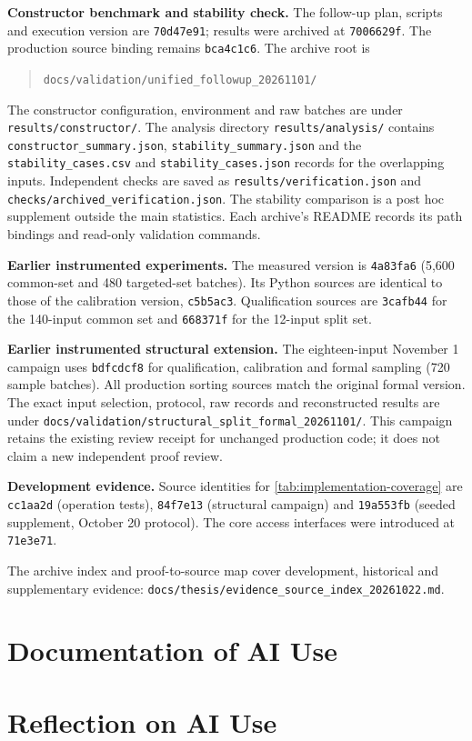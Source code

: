 \textbf{Constructor benchmark and stability check.} The follow-up plan,
scripts and execution version are \texttt{70d47e91}; results were archived
at \texttt{7006629f}. The production source binding remains
\texttt{bca4c1c6}. The archive root is
\begin{quote}\small
\nolinkurl{docs/validation/unified_followup_20261101/}
\end{quote}
The constructor configuration, environment and raw batches are under
\nolinkurl{results/constructor/}. The analysis directory
\nolinkurl{results/analysis/} contains \nolinkurl{constructor_summary.json},
\nolinkurl{stability_summary.json} and the \nolinkurl{stability_cases.csv}
and \nolinkurl{stability_cases.json} records for the \UnifiedStabilityN{}
overlapping inputs. Independent checks are saved as
\nolinkurl{results/verification.json} and
\nolinkurl{checks/archived_verification.json}. The stability comparison is a
post hoc supplement outside the main statistics. Each archive's README
records its path bindings and read-only validation commands.

\textbf{Earlier instrumented experiments.} The measured version is \texttt{4a83fa6}
(5,600 common-set and 480 targeted-set batches). Its Python sources are
identical to those of the calibration version, \texttt{c5b5ac3}.
Qualification sources are \texttt{3cafb44} for the 140-input common set
and \texttt{668371f} for the 12-input split set.

\textbf{Earlier instrumented structural extension.} The eighteen-input November 1 campaign
uses \texttt{bdfcdcf8} for qualification, calibration and formal sampling
(720 sample batches). All production sorting sources match the original
formal version. The exact input selection, protocol, raw records and
reconstructed results are under
\nolinkurl{docs/validation/structural_split_formal_20261101/}.
This campaign retains the existing review receipt for unchanged production
code; it does not claim a new independent proof review.

\textbf{Development evidence.} Source identities for
\cref{tab:implementation-coverage} are \texttt{cc1aa2d} (operation tests),
\texttt{84f7e13} (structural campaign) and \texttt{19a553fb} (seeded
supplement, October 20 protocol). The core access interfaces were introduced
at \texttt{71e3e71}.

The archive index and proof-to-source map cover development, historical and
supplementary evidence:
\nolinkurl{docs/thesis/evidence_source_index_20261022.md}.

\clearpage
\section{Documentation of AI Use}
\label{sec:appendix-ai-use}



\section{Reflection on AI Use}
\label{sec:appendix-ai-reflection}


